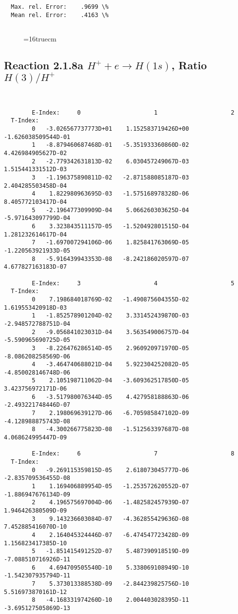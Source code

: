 \documentclass[12pt,dvipdfmx]{article}
\begin{document}
{\begin{small}
\begin{verbatim}
  Max. rel. Error:    .9699 \%
  Mean rel. Error:    .4163 \%


\end{verbatim}\end{small}
\begin{figure} \label{2.1.8_equil}
\epsfxsize=16truecm
\end{figure}
\newpage


\subsection{
Reaction 2.1.8a  $H^+ + e \rightarrow H(1s) $,  Ratio $H(3)/H^+$
}

\begin{small}\begin{verbatim}


        E-Index:     0                     1                     2
  T-Index:
        0   -3.026567737773D+01    1.152583719426D+00   -1.626038509544D-01
        1   -8.879460687468D-01   -5.351933360860D-02    4.426984905627D-02
        2   -2.779342631813D-02    6.030457249067D-03    1.515441331512D-03
        3   -1.196375890811D-02   -2.871588085187D-03    2.404285503458D-04
        4    1.822980963695D-03   -1.575168978328D-06    8.405772103417D-04
        5   -2.196477309909D-04    5.066260303625D-04   -5.971643097799D-04
        6    3.323843511157D-05   -1.520492801515D-04    1.281232614617D-04
        7   -1.697007294106D-06    1.825841763069D-05   -1.220563921933D-05
        8   -5.916439943353D-08   -8.242186020597D-07    4.677827163183D-07

        E-Index:     3                     4                     5
  T-Index:
        0    7.198684018769D-02   -1.490875604355D-02    1.619553420918D-03
        1   -1.852578901204D-02    3.331452439870D-03   -2.948572788751D-04
        2   -9.056841023031D-04    3.563549006757D-04   -5.590965690725D-05
        3   -8.226476286514D-05    2.960920971970D-05   -8.086208258569D-06
        4   -3.464740688021D-04    5.922304252082D-05   -4.850028146748D-06
        5    2.105198711062D-04   -3.609362517850D-05    3.423756972171D-06
        6   -3.517980076344D-05    4.427958188863D-06   -2.493221748446D-07
        7    2.198069639127D-06   -6.705985847102D-09   -4.128988875743D-08
        8   -4.300266775823D-08   -1.512563397687D-08    4.068624995447D-09

        E-Index:     6                     7                     8
  T-Index:
        0   -9.269115359815D-05    2.618073045777D-06   -2.835709536455D-08
        1    1.169406889954D-05   -1.253572620552D-07   -1.886947676134D-09
        2    4.196575697004D-06   -1.482582457939D-07    1.946426380509D-09
        3    9.143236603084D-07   -4.362855429636D-08    7.452885416070D-10
        4    2.164045324446D-07   -6.474547723428D-09    1.156823417385D-10
        5   -1.851415491252D-07    5.487390918519D-09   -7.088510716926D-11
        6    4.694709505540D-10    5.338069108949D-10   -1.542307935794D-11
        7    5.373013388538D-09   -2.844239825756D-10    5.516973870161D-12
        8   -4.168331974260D-10    2.004403028395D-11   -3.695127505869D-13


\end{verbatim}
\end{small}}
\end{document}

